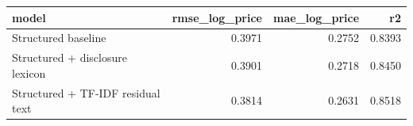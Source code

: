 \begin{tabular}{lrrr}
\toprule
model & rmse\_log\_price & mae\_log\_price & r2 \\
\midrule
Structured baseline & 0.3971 & 0.2752 & 0.8393 \\
Structured + disclosure lexicon & 0.3901 & 0.2718 & 0.8450 \\
Structured + TF-IDF residual text & 0.3814 & 0.2631 & 0.8518 \\
\bottomrule
\end{tabular}
